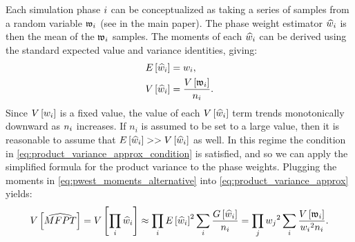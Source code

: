 Each  simulation phase $i$ can be conceptualized as taking a series of samples from a random variable $\mathfrak{w}_{i}$ (see  in the main paper). The phase weight estimator $\widehat{w}_{i}$ is then the mean of the $\mathfrak{w}_{i}$ samples. The moments of each $\widehat{w}_{i}$ can be derived using the standard expected value and variance identities\supercite{Borovkov:2013hf}, giving:
    \begin{align}
    \label{eq:pwest_moments_alternative}
        \begin{split}
            E \left[ \widehat{w}_{i} \right] &= w_{i}, \\
            V \left[ \widehat{w}_{i} \right] &= \frac{V \left[ \mathfrak{w}_{i} \right]}{n_i}.
        \end{split}
    \end{align}
Since $V \left[ w_i \right]$ is a fixed value, the value of each $V \left[ \widehat{w}_{i} \right]$ term trends monotonically downward as $n_{i}$ increases. If $n_i$ is assumed to be set to a large value, then it is reasonable to assume that $E \left[ \widehat{w}_{i} \right] >> V \left[ \widehat{w}_{i} \right]$ as well. In this regime the condition in \eqref{eq:product_variance_approx_condition} is satisfied, and so we can apply the simplified formula for the product variance to the phase weights. Plugging the moments in \eqref{eq:pwest_moments_alternative} into \eqref{eq:product_variance_approx} yields:
    \begin{equation*}
        V \left[ \widehat{MFPT} \right] = V \left[ \prod_i \widehat{w}_{i} \right] \approx \prod_i E \left[ \widehat{w}_{i} \right]^2 \sum_i \frac{G \left[ \widehat{w}_{i} \right]}{n_i} = \prod_j w_{j} {}^2 \sum_i \frac{V \left[ \mathfrak{w}_{i} \right]}{w_{i} {}^2 n_i}.
    \end{equation*}
    


